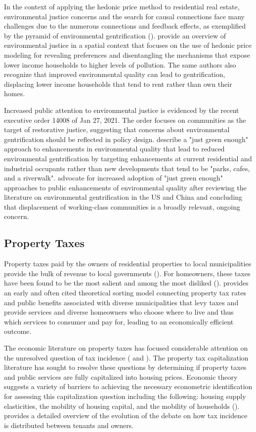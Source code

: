 \documentclass[ecta,nameyear,draft]{econsocart}
\theoremstyle{plain}
\theoremstyle{remark}
\begin{document}
In the context of applying the hedonic price method to residential real estate, environmental justice concerns and the search for causal connections face many challenges due to the numerous connections and feedback effects, as exemplified by the pyramid of environmental gentrification (\cite{banzhafJustice19}). \cite{banzhafJustice19} provide an overview of environmental justice in a spatial context that focuses on the use of hedonic price modeling for revealing preferences and disentangling the mechanisms that expose lower income households to higher levels of pollution. The same authors also recognize that improved environmental quality can lead to gentrification, displacing lower income households that tend to rent rather than own their homes. 

Increased public attention to environmental justice is evidenced by the recent executive order 14008 of Jan 27, 2021. The order focuses on communities as the target of restorative justice, suggesting that concerns about environmental gentrification should be reflected in policy design. \cite{curran12} describe a "just green enough" approach to enhancements in environmental quality that lead to reduced environmental gentrification by targeting enhancements at current residential and industrial occupants rather than new developments that tend to be "parks, cafes, and a riverwalk". \cite{wolch14} advocate for increased adoption of "just green enough" approaches to public enhancements of environmental quality after reviewing the literature on environmental gentrification in the US and China and concluding that displacement of working-class communities is a broadly relevant, ongoing concern. 

\subsection{Property Taxes}
Property taxes paid by the owners of residential properties to local municipalities provide the bulk of revenue to local governments (\cite{zodrow01}). For homeowners, these taxes have been found to be the most salient and among the most disliked (\cite{cabralhoxby}). \cite{tiebout56} provides an early and often cited theoretical sorting model connecting property tax rates and public benefits associated with diverse municipalities that levy taxes and provide services and diverse homeowners who choose where to live and thus which services to consumer and pay for, leading to an economically efficient outcome.

The economic literature on property taxes has focused considerable attention on the unresolved question of tax incidence (\cite{zodrow01} and \cite{sirmans08}). The property tax capitalization literature has sought to resolve these questions by determining if property taxes and public services are fully capitalized into housing prices. Economic theory suggests a variety of barriers to achieving the necessary econometric identification for assessing this capitalization question including the following: housing supply elasticities, the mobility of housing capital, and the mobility of households (\cite{sirmans08}). \cite{england16} provides a detailed overview of the evolution of the debate on how tax incidence is distributed between tenants and owners.
\end{document}
